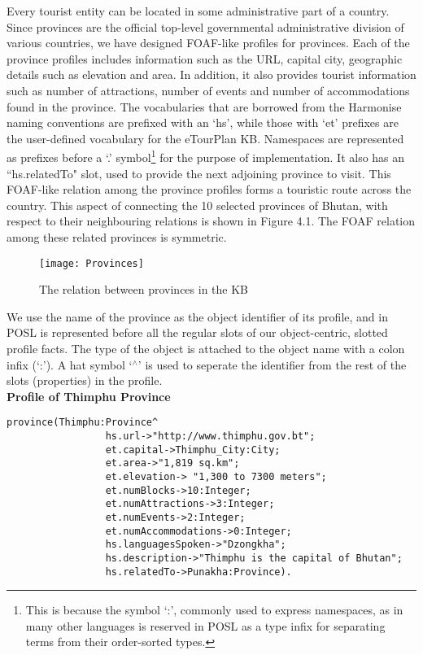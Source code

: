 \hspace{0.3in}Every tourist entity can be located in some administrative part of a country. Since provinces are the official top-level governmental administrative division of various countries, %
we have designed FOAF-like profiles for provinces. Each of the province profiles includes information such as the URL, capital city, geographic details such as elevation and area. In addition, it also provides tourist information such as number of attractions, number of events and number of accommodations found in the province. The vocabularies that are borrowed from the Harmonise naming conventions are prefixed with an `hs', while those with `et' prefixes are the user-defined vocabulary for the eTourPlan KB. Namespaces are represented as prefixes before a `.' symbol\footnote{This is because the symbol `:', commonly used to express namespaces, as in many other languages is reserved in POSL as a type infix for separating terms from their order-sorted types.} for the purpose of implementation. It also has an ``hs.relatedTo" slot, used to provide the next adjoining province to visit. This FOAF-like relation among the province profiles forms a touristic route across the country. This aspect of connecting the 10 selected provinces of Bhutan, with respect to their neighbouring relations is shown in Figure 4.1. The FOAF relation among these related provinces is symmetric.

\begin{figure}
\begin{center}
\texttt{[image: Provinces]}
\caption {The relation between provinces in the KB}
\label{fig:Fig4.1}
\end{center}
\end{figure} 


\hspace{0.3in} We use the name of the province as the object identifier of its profile, and in POSL is represented before all the regular slots of our object-centric, slotted profile facts. The type of the object is attached to the object name with a colon infix (`:'). A hat symbol `$^{\wedge}$' is used to seperate the identifier from the rest of the slots (properties) in the profile. 
\\

\textbf{Profile of Thimphu Province}

\begin{small}
\singlespacing
\begin{verbatim} 
province(Thimphu:Province^
                 hs.url->"http://www.thimphu.gov.bt";
                 et.capital->Thimphu_City:City;
                 et.area->"1,819 sq.km";
                 et.elevation-> "1,300 to 7300 meters";
                 et.numBlocks->10:Integer;
                 et.numAttractions->3:Integer;
                 et.numEvents->2:Integer;
                 et.numAccommodations->0:Integer;
                 hs.languagesSpoken->"Dzongkha";
                 hs.description->"Thimphu is the capital of Bhutan";
                 hs.relatedTo->Punakha:Province).
\end{verbatim}
\end{small}

